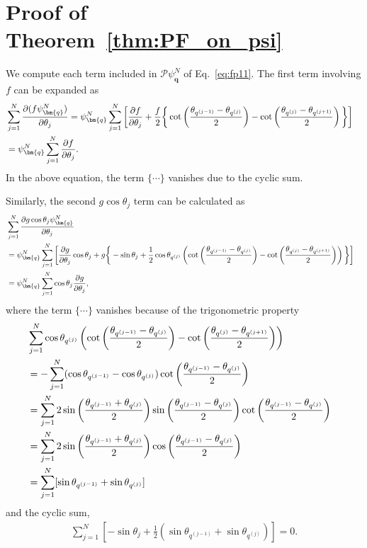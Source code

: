 \documentclass[
amsmath,amssymb,
]{revtex4-2}
\begin{document}
\clearpage

\appendix


\section{Proof of Theorem~\ref{thm:PF_on_psi}}

We compute each term included in $\mathcal{P}\psi^N_{\bm{q}}$ of Eq.~\eqref{eq:fp11}. 
The first term involving $f$ can be expanded as 
% 
\begin{align}
    &\sum_{j=1}^N \frac{\partial ( f\psi^N_{\bm{q}} )}{\partial \theta_j} = \psi^N_{\bm{q}}\sum_{j=1}^N \bigg[\frac{\partial f}{\partial \theta_j}+ \frac{f}{2}\bigg\{\cot\left(\frac{\theta_{q^{(j-1)}}-\theta_{q^{(j)}}}{2}\right) - \cot\left(\frac{\theta_{q^{(j)}}-\theta_{q^{(j+1)}}}{2}\right)\bigg\}\bigg]\cr
    &= \psi^N_{\bm{q}}\sum_{j=1}^N \frac{\partial f}{\partial \theta_j}.
\end{align}
In the above equation, the term $\{\cdots\}$ vanishes due to the cyclic sum.

Similarly, the second $g \cos \theta_j$ term can be calculated as
\begin{align}
    &\sum_{j=1}^N \frac{\partial g \cos \theta_j \psi_{\bm{q}}^N  }{\partial \theta_j}\cr
    &= \psi^N_{\bm{q}}\sum_{j=1}^N \bigg[\frac{\partial g}{\partial \theta_j}\cos \theta_j+ g\bigg\{- \sin\theta_j+ \frac{1}{2}\cos \theta_{q^{(j)}} \left(\cot\left(\frac{\theta_{q^{(j-1)}}-\theta_{q^{(j)}}}{2}\right) - \cot\left(\frac{\theta_{q^{(j)}}-\theta_{q^{(j+1)}}}{2}\right)\right)\bigg\}\bigg]\cr
    &= \psi^N_{\bm{q}}\sum_{j=1}^N \cos \theta_j \frac{\partial g}{\partial \theta_j},
\end{align}
where the term $\{\cdots\}$ vanishes because of the trigonometric property
\begin{align}
&\sum_{j=1}^N \cos \theta_{q^{(j)}} \left(\cot\left(\frac{\theta_{q^{(j-1)}}-\theta_{q^{(j)}}}{2}\right) - \cot\left(\frac{\theta_{q^{(j)}}-\theta_{q^{(j+1)}}}{2}\right)\right) \cr
&= -\sum_{j=1}^N (\cos\theta_{q^{(j-1)}} -\cos\theta_{q^{(j)}})\cot\left(\frac{\theta_{q^{(j-1)}}-\theta_{q^{(j)}}}{2}\right) \cr
&=\sum_{j=1}^N 2\sin\bigg(\frac{\theta_{q^{(j-1)}}+\theta_{q^{(j)}}}{2}\bigg)\sin\bigg(\frac{\theta_{q^{(j-1)}}-\theta_{q^{(j)}}}{2}\bigg)\cot\left(\frac{\theta_{q^{(j-1)}}-\theta_{q^{(j)}}}{2}\right) \cr
&=\sum_{j=1}^N 2\sin\bigg(\frac{\theta_{q^{(j-1)}}+\theta_{q^{(j)}}}{2}\bigg)\cos\bigg(\frac{\theta_{q^{(j-1)}}-\theta_{q^{(j)}}}{2}\bigg) \cr
&= \sum_{j=1}^N [ \sin \theta_{q^{(j-1)}} + \sin \theta_{q^{(j)}}]
\end{align}
and the cyclic sum,
%
\begin{align}
    \sum_{j=1}^N \left[-\sin\theta_j + \frac{1}{2} \left(\sin \theta_{q^{(j-1)}} + \sin \theta_{q^{(j)}}\right)\right] = 0.
\end{align}
\end{document}
